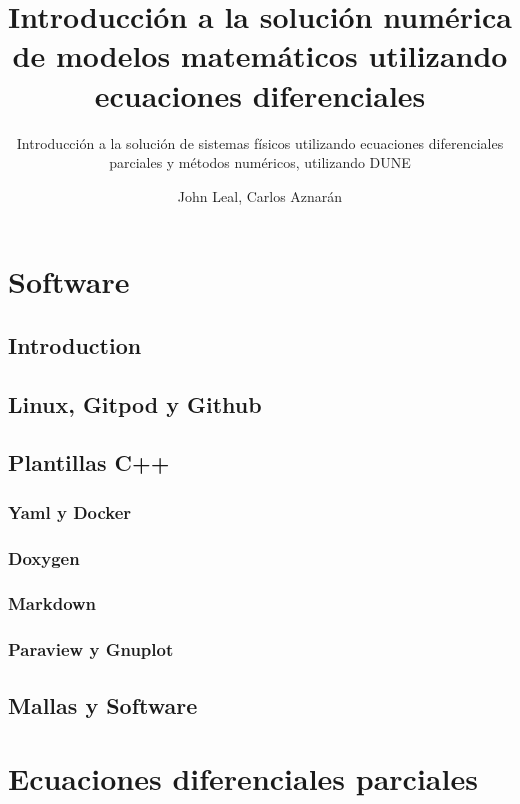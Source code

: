 \documentclass[10pt,
	a4paper,
	spanish,
	titlepage=firstiscover,
	titlepage=true,
	BCOR=2cm,
	DIV=12
]{scrbook}
\author{John Leal, Carlos Aznarán}
\title{Introducción a la solución numérica de modelos matemáticos utilizando ecuaciones 
diferenciales}
\subtitle{Introducción a la solución de sistemas físicos utilizando ecuaciones diferenciales 
parciales y métodos numéricos, utilizando DUNE}
\begin{document}
\maketitle
\tableofcontents

\begin{refsection}
	\part{Software} %
	\chapter{Introduction}
	\chapter{Linux, Gitpod y Github}
	\chapter{Plantillas C++}
	\section{Yaml y Docker}
	\section{Doxygen}
	\section{Markdown}
	\section{Paraview y Gnuplot}
	\chapter{Mallas y Software}
	\part{Ecuaciones diferenciales parciales} %

\end{refsection}
\end{document}
